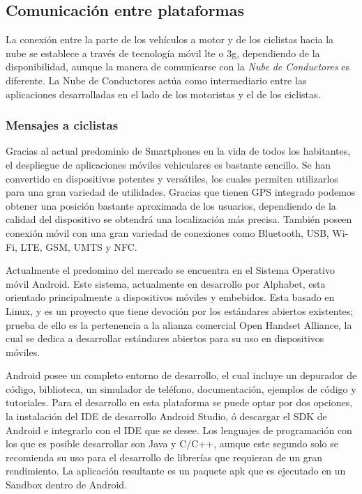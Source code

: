 \subsection{Comunicación entre plataformas}\label{ssection:comunicacion_plataformas}
La conexión entre la parte de los vehículos a motor y de los ciclistas hacia la nube
se establece a través de tecnología móvil \gls{lte} o \gls{3g}, dependiendo de la
disponibilidad, aunque la manera de comunicarse con la \emph{Nube de Conductores} es
diferente. La Nube de Conductores actúa como intermediario entre las aplicaciones
desarrolladas en el lado de los motoristas y el de los ciclistas.

\subsubsection{Mensajes a ciclistas}\label{sssection:mensajes_ciclistas}
Gracias al actual predominio de Smartphones en la vida de todos los habitantes, el
despliegue de aplicaciones móviles vehiculares es bastante sencillo. Se han convertido
en dispositivos potentes y versátiles, los cuales permiten utilizarlos para una gran
variedad de utilidades. Gracias que tienen GPS integrado podemos obtener una posición
bastante aproximada de los usuarios, dependiendo de la calidad del dispositivo se obtendrá
una localización más precisa. También poseen conexión móvil con una gran variedad
de conexiones como Bluetooth, USB, Wi-Fi, LTE, GSM, UMTS y NFC.

Actualmente el predomino del mercado se encuentra en el Sistema Operativo móvil Android.
Este sistema, actualmente en desarrollo por Alphabet, esta orientado principalmente a
dispositivos móviles y embebidos. Esta basado en Linux, y es un proyecto que tiene
devoción por los estándares abiertos existentes; prueba de ello es la pertenencia a
la alianza comercial Open Handset Alliance, la cual se dedica a desarrollar estándares
abiertos para su uso en dispositivos móviles.

Android posee un completo entorno de desarrollo, el cual incluye un depurador de
código, biblioteca, un simulador de teléfono, documentación, ejemplos de código y
tutoriales. Para el desarrollo en esta plataforma se puede optar por dos opciones, la
instalación del IDE de desarrollo Android Studio, ó descargar el SDK de Android e
integrarlo con el IDE que se desee. Los lenguajes de programación con los que es
posible desarrollar son Java y C/C++, aunque este segundo solo se recomienda su uso
para el desarrollo de librerías que requieran de un gran rendimiento. La aplicación
resultante es un paquete apk que es ejecutado en un Sandbox dentro de Android.

